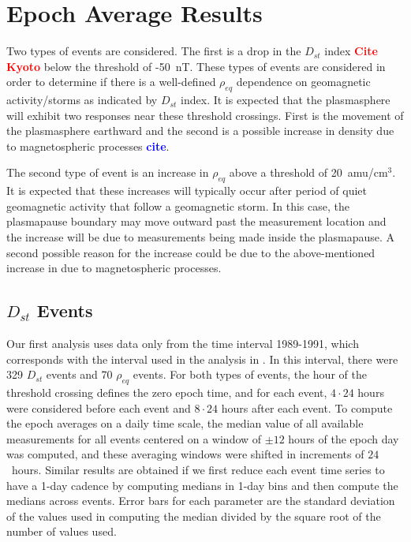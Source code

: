 \documentclass[10pt,twocolumn]{article}
\newcommand{\vinote}[1]{\textcolor{red}{\textbf{#1}}} %
\newcommand{\inote}[1]{\textcolor{blue}{\textbf{#1}}} %
\def\note#1\par{\textcolor{blue}{\textbf{#1}}\\}
\begin{document}
\section{Epoch Average Results}

Two types of events are considered. The first is a drop in the $D_{st}$ index \vinote{Cite Kyoto} below the threshold of -50~nT. These types of events are considered in order to determine if there is a well-defined $\rho_{eq}$ dependence on geomagnetic activity/storms as indicated by $D_{st}$ index.  It is expected that the plasmasphere will exhibit two responses near these threshold crossings.  First is the movement of the plasmasphere earthward and the second is a possible increase in density due to magnetospheric processes \inote{cite}. 

The second type of event is an increase in $\rho_{eq}$ above a threshold of 20~amu/cm$^3$.  It is expected that these increases will typically occur after period of quiet geomagnetic activity that follow a geomagnetic storm.  In this case, the plasmapause boundary may move outward past the measurement location and the increase will be due to measurements being made inside the plasmapause.  A second possible reason for the increase could be due to the above-mentioned increase in due to magnetospheric processes.

\subsection{$D_{st}$ Events}

Our first analysis uses data only from the time interval 1989-1991, which corresponds with the interval used in the analysis in \cite{Takahashi2010}. In this interval, there were 329 $D_{st}$ events and 70 $\rho_{eq}$ events.  For both types of events, the hour of the threshold crossing defines the zero epoch time, and for each event, $4\cdot24$ hours were considered before each event and $8\cdot24$ hours after each event.  To compute the epoch averages on a daily time scale, the median value of all available measurements for all events centered on a window of $\pm 12$ hours of the epoch day was computed, and these averaging windows were shifted in increments of $24$~hours. Similar results are obtained if we first reduce each event time series to have a 1-day cadence by computing medians in 1-day bins and then compute the medians across events.  Error bars for each parameter are the standard deviation of the values used in computing the median divided by the square root of the number of values used.
\end{document}
